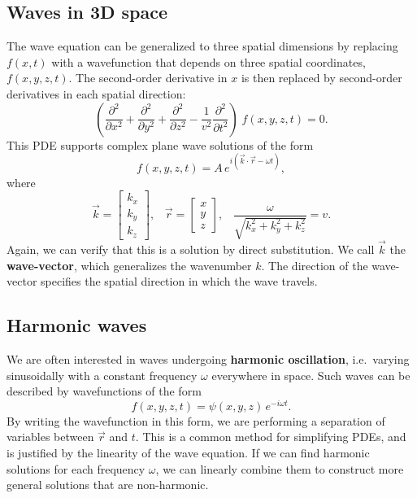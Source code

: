 \documentclass[10pt,a4paper]{article}
\begin{document}
\subsection{Waves in 3D space}
\label{waves-in-3d-space}

The wave equation can be generalized to three spatial dimensions by
replacing $f(x,t)$ with a wavefunction that depends on three spatial
coordinates, $f(x,y,z,t)$. The second-order derivative in $x$ is then
replaced by second-order derivatives in each spatial direction:
\begin{equation}
\left(\frac{\partial^2}{\partial x^2} + \frac{\partial^2}{\partial y^2} + \frac{\partial^2}{\partial z^2} - \frac{1}{v^2} \frac{\partial^2}{\partial t^2}\right) \; f(x,y,z,t) = 0.
\label{3dwave}
\end{equation}
This PDE supports complex plane wave solutions of the form
\begin{equation}
f(x,y,z,t) = A \, e^{i(\vec{k} \cdot \vec{r} - \omega t)},
\end{equation}
where
\begin{equation}
\vec{k} = \begin{bmatrix}k_x\\k_y\\k_z\end{bmatrix}, \;\;\; \vec{r} = \begin{bmatrix}x\\y\\z\end{bmatrix}, \;\;\;\frac{\omega}{\sqrt{k_x^2 + k_y^2 + k_z^2}} = v.
\end{equation}
Again, we can verify that this is a solution by direct
substitution. We call $\vec{k}$ the \textbf{wave-vector}, which
generalizes the wavenumber $k$. The direction of the wave-vector
specifies the spatial direction in which the wave travels.

\subsection{Harmonic waves}
\label{harmonic-waves}

We are often interested in waves undergoing \textbf{harmonic
oscillation}, i.e.~varying sinusoidally with a constant frequency
$\omega$ everywhere in space. Such waves can be described by
wavefunctions of the form
\begin{equation}
f(x,y,z,t) = \psi(x,y,z) \, e^{-i\omega t}.
\end{equation}
By writing the wavefunction in this form, we are performing a separation
of variables between $\vec{r}$ and $t$. This is a common method for
simplifying PDEs, and is justified by the linearity of the wave
equation. If we can find harmonic solutions for each frequency
$\omega$, we can linearly combine them to construct more general
solutions that are non-harmonic.
\end{document}
